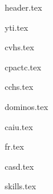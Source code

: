 \documentclass[11pt]{article}
\begin{document}
{header.tex}


{yti.tex}

\spacing{}

{cvhs.tex}

\spacing{}

{cpactc.tex}

\spacing{}

{cchs.tex}

\spacing{}


{dominos.tex}

\spacing{}

{caiu.tex}

\spacing{}

{fr.tex}

\spacing{}

{casd.tex}

\spacing{}


{skills.tex}
\end{document}
